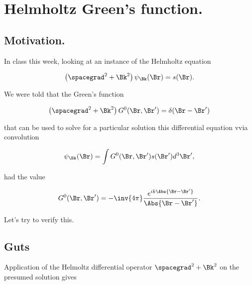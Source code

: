
%

\chapter{Helmholtz Green's function.}
\label{chap:helmholtzGreens}
{}
\date{Dec 12, 2011}

\beginArtWithToc

\section{Motivation.}

In class this week, looking at an instance of the Helmholtz equation

\begin{equation}\label{eqn:helmholtzGreens:10}
\left( \spacegrad^2 + \Bk^2\right) \psi_\Bk(\Br) = s(\Br).
\end{equation}

We were told that the Green's function

\begin{equation}\label{eqn:helmholtzGreens:30}
\left( \spacegrad^2 + \Bk^2\right) G^0(\Br, \Br') = \delta(\Br- \Br')
\end{equation}

that can be used to solve for a particular solution this differential equation vvia convolution

\begin{equation}\label{eqn:helmholtzGreens:50}
\psi_\Bk(\Br) = \int G^0(\Br, \Br') s(\Br') d^3 \Br',
\end{equation}

had the value

\begin{equation}\label{eqn:helmholtzGreens:70}
G^0(\Br, \Br') = - \inv{4 \pi} \frac{e^{i k \Abs{\Br - \Br'}} }{\Abs{\Br - \Br'}}.
\end{equation}

Let's try to verify this.

\section{Guts}

Application of the Helmoltz differential operator $\spacegrad^2 + \Bk^2$ on the presumed solution gives

